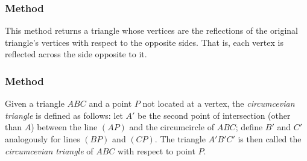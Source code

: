
\subsubsection{Method } %
\label{ssub:method_triangle_reflection}

This method returns a triangle whose vertices are the reflections of the original triangle's vertices with respect to the opposite sides. That is, each vertex is reflected across the side opposite to it.

\begin{tkzexample}[latex=.5\textwidth]
\end{tkzexample}

\subsubsection{Method } %
\label{ssub:method_triangle_circumcevian}

Given a triangle $ABC$ and a point $P$ not located at a vertex, the \emph{circumcevian triangle} is defined as follows: let $A'$ be the second point of intersection (other than $A$) between the line $(AP)$ and the circumcircle of $ABC$; define $B'$ and $C'$ analogously for lines $(BP)$ and $(CP)$. The triangle $A'B'C'$ is then called the \emph{circumcevian triangle} of $ABC$ with respect to point $P$.

\vspace{1em}

\begin{tkzexample}[latex=6cm]
\begin{center}
\end{center}

\end{tkzexample}

